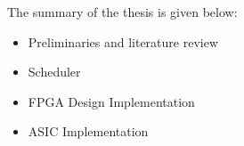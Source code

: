 \pagebreak

The summary of the thesis is given below:
\begin{itemize}
    \item Preliminaries and literature review
    \item Scheduler
    \item FPGA Design Implementation
    \item ASIC Implementation
\end{itemize} 


